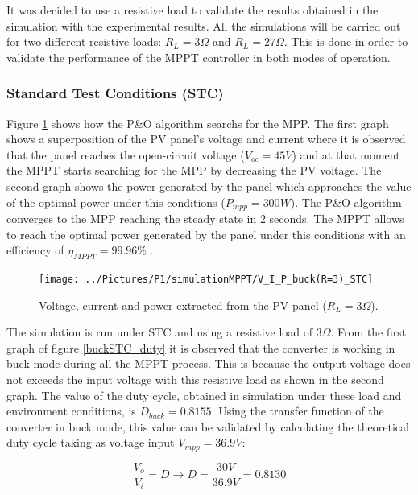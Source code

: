  It was decided to use a resistive load to validate the results obtained in the simulation with the experimental results. All the simulations will be carried out for two different resistive loads: $R_{L}=3\Omega$ and $R_{L}=27\Omega$. This is done in order to validate the performance of the MPPT controller in both modes of operation.
 \subsubsection*{Standard Test Conditions (STC)}
 
 Figure \ref{buckSTC} shows how the P\&O algorithm searchs for the MPP. The first graph shows a superposition of the PV panel's voltage and current where it is observed that the panel reaches the open-circuit voltage ($V_{oc}=45 V$) and at that moment the MPPT starts searching for the MPP by decreasing the PV voltage. The second graph shows the power generated by the panel which approaches the value of the optimal power under this conditions ($P_{mpp}=300 W$). The P\&O algorithm converges to the MPP reaching the steady state in 2 seconds. The MPPT allows to reach the optimal power generated by the panel under this conditions with an efficiency of $\eta_{MPPT} = 99.96\% $ .

\begin{figure}[H]
	\begin{center}
		\texttt{[image: ../Pictures/P1/simulationMPPT/V\_I\_P\_buck(R=3)\_STC]}
		\caption{Voltage, current and power extracted from the PV panel ($R_{L}=3\Omega$).}
		\label{buckSTC} 
	\end{center}	
\end{figure}

The simulation is run under STC and using a resistive load of $3\Omega$. From the first graph of figure \ref{buckSTC_duty} it is observed that the converter is working in buck mode during all the MPPT process. This is because the output voltage does not exceeds the input voltage with this resistive load as shown in the second graph. The value of the duty cycle, obtained in simulation under these load and environment conditions, is $D_{buck}= 0.8155$. Using the transfer function of the converter in  buck mode, this value can be validated by calculating the theoretical duty cycle taking as voltage input $V_{mpp}=36.9 V$: 

\begin{equation}\label{buckmodeTF}
\frac{V_o}{V_i} = D  \rightarrow D = \frac{30V}{36.9V}= 0.8130 
\end{equation}


